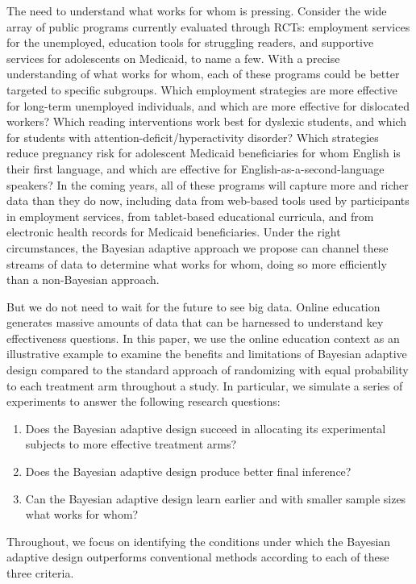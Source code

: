 \documentclass{acm_proc_article-sp}
\begin{document}
The need to understand what works for whom is pressing. 
Consider the wide array of public programs currently evaluated through RCTs: employment services for the unemployed, education tools for struggling readers, and supportive services for adolescents on Medicaid, to name a few. With a precise understanding of what works for whom, each of these programs could be better targeted to specific subgroups. 
Which employment strategies are more effective for long-term unemployed individuals, and which are more effective for dislocated workers? 
Which reading interventions work best for dyslexic students, and which for students with attention-deficit/hyperactivity disorder? 
Which strategies reduce pregnancy risk for adolescent Medicaid beneficiaries for whom English is their first language, and which are effective for English-as-a-second-language speakers? 
In the coming years, all of these programs will capture more and richer data than they do now, including data from web-based tools used by participants in employment services, from tablet-based educational curricula, and from electronic health records for Medicaid beneficiaries. 
Under the right circumstances, the Bayesian adaptive approach we propose can channel these streams of data to determine what works for whom, doing so more efficiently than a non-Bayesian approach.

But we do not need to wait for the future to see big data. 
Online education generates massive amounts of data that can be harnessed to understand key effectiveness questions. 
In this paper, we use the online education context as an illustrative example to examine the benefits and limitations of Bayesian adaptive design compared to the standard approach of randomizing with equal probability to each treatment arm throughout a study. 
In particular, we simulate a series of experiments to answer the following research questions: 
\begin{enumerate}
  \item	Does the Bayesian adaptive design succeed in allocating its experimental subjects to more effective treatment arms?
  \item	Does the Bayesian adaptive design produce better final inference?
  \item	Can the Bayesian adaptive design learn earlier and with smaller sample sizes what works for whom?
\end{enumerate}

Throughout, we focus on identifying the conditions under which the Bayesian adaptive design outperforms conventional methods according to each of these three criteria.
\end{document}
